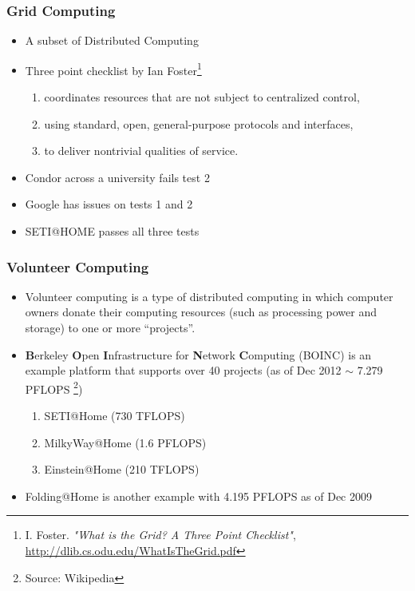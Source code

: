 \documentclass[slidestop,mathserif,compress,xcolor=svgnames,table]{beamer}
\begin{document}
\begin{frame}
  \frametitle{\small Grid Computing}
  \begin{itemize}
    \item A subset of Distributed Computing
    \item Three point checklist by Ian Foster\let\thefootnote\relax\footnote{\tiny I. Foster. \textit{"What is the Grid? A Three Point Checklist"}, \url{http://dlib.cs.odu.edu/WhatIsTheGrid.pdf}}
    \begin{enumerate}
      \item coordinates resources that are not subject to centralized control,
      \item using standard, open, general-purpose protocols and interfaces,
      \item to deliver nontrivial qualities of service.
    \end{enumerate}
    \item Condor across a university fails test 2
    \item Google has issues on tests 1 and 2
    \item SETI@HOME passes all three tests
  \end{itemize}
\end{frame}

\begin{frame}
  \frametitle{\small Volunteer Computing}
  \begin{itemize}
    \item Volunteer computing is a type of distributed computing in which computer owners donate their computing resources (such as processing power and storage) to one or more ``projects''.
    \item \textbf{B}erkeley \textbf{O}pen \textbf{I}nfrastructure for \textbf{N}etwork \textbf{C}omputing (BOINC) is an example platform that supports over 40 projects (as of Dec 2012 $\sim$ 7.279 PFLOPS \let\thefootnote\relax\footnote{\tiny Source: Wikipedia})
    \begin{enumerate}
      \item SETI@Home (730 TFLOPS)
      \item MilkyWay@Home (1.6 PFLOPS)
      \item Einstein@Home (210 TFLOPS)
    \end{enumerate}
    \item Folding@Home is another example with 4.195 PFLOPS as of Dec 2009
  \end{itemize}
\end{frame}
\end{document}
